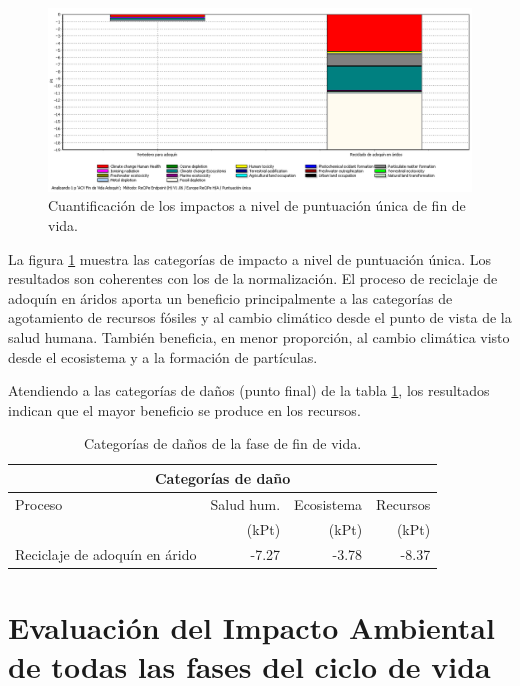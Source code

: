 \begin{figure}[!htb]
\centering
\includegraphics[width=15cm]{img/fdv_puntuacionunica.png}
\caption{Cuantificación de los impactos a nivel de puntuación única de fin de vida.}
\label{fig:fdv_puntuacionunica}
\end{figure}

La figura \ref{fig:fdv_puntuacionunica} muestra las categorías de impacto a nivel de puntuación única. Los resultados son coherentes con los de la normalización. El proceso de reciclaje de adoquín en áridos aporta un beneficio principalmente a las categorías de agotamiento de recursos fósiles y al cambio climático desde el punto de vista de la salud humana. También beneficia, en menor proporción, al cambio climática visto desde el ecosistema y a la formación de partículas.

Atendiendo a las categorías de daños (punto final) de la tabla \ref{categoriasdanosfdv}, los resultados indican que el mayor beneficio se produce en los recursos.

\begin{table}[!htb]
\centering
\begin{tabular}{p{6cm}rrr}
\toprule
\multicolumn{4}{c}{Categorías de daño}\\
\midrule
Proceso & Salud hum. & Ecosistema & Recursos\\
 & (kPt) & (kPt) & (kPt)\\
\midrule
Reciclaje de adoquín en árido & -7.27 & -3.78 & -8.37\\
\bottomrule
\end{tabular}
\caption{Categorías de daños de la fase de fin de vida.}
\label{categoriasdanosfdv}
\end{table}

\section{Evaluación del Impacto Ambiental de todas las fases del ciclo de vida}

